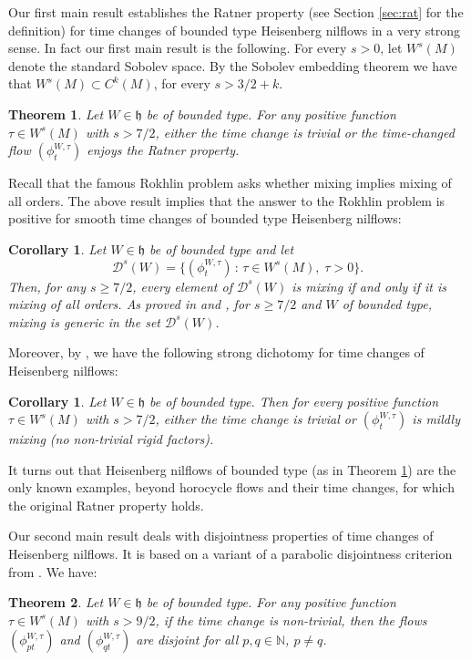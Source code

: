 \documentclass[10pt]{amsart}
\let\mathcal\mathscr
\newcommand{\sep}{\,:\,}
\theoremstyle{definition}
\theoremstyle{plain}
\newtheorem{theorem}{Theorem}
\newtheorem{corollary}[definition]{Corollary}
\newcommand\NN{\mathbb{N}}
\newcommand{\cD}{\mathcal D}
\begin{document}
Our first main result establishes the Ratner property (see Section \ref{sec:rat} for the definition) for time changes of bounded type Heisenberg nilflows in a very strong sense. In fact our first main result is the following.
For every $s>0$, let $W^s(M)$ \hbox{denote} the standard Sobolev space. By the Sobolev embedding theorem we have that $W^s(M) \subset C^k(M)$, for every $s> 3/2 + k$.


\begin{theorem}\label{main:thm'} Let $W\in \mathfrak h$ be of bounded type. For any positive function $\tau\in W^s(M)$ with $s>7/2$, either the time change is trivial or the time-changed flow $(\phi_t^{W,\tau})$ enjoys the Ratner property.
\end{theorem}


Recall that the famous Rokhlin problem asks whether mixing implies mixing of all orders.
The above result implies that the answer to the Rokhlin problem is positive for smooth time changes of bounded type Heisenberg nilflows:
\begin{corollary} Let $W\in \mathfrak h$ be of bounded type and let
\[
\cD^s(W)=\{(\phi_t^{W,\tau})\sep \tau\in W^s(M),\; \tau>0\}.
\]
Then, for any $s\geq 7/2$, every element of $\cD^s(W)$ is mixing if and only if it is mixing of all orders.
As proved in \cite{AFU} and \cite{FK}, for $s\geq 7/2$ and $W$ of bounded type, mixing is generic in the set $\cD^s(W)$.
\end{corollary}

Moreover, by \cite{KL}, we have the following strong dichotomy for time changes of Heisenberg nilflows:
\begin{corollary}\label{corA} Let $W\in \mathfrak h$ be of bounded type. Then for every positive function $\tau\in W^s(M)$ with $s>7/2$, either
the time change is trivial or $(\phi_t^{W,\tau})$ is mildly mixing (no non-trivial rigid factors).
\end{corollary}

It turns out that Heisenberg nilflows of bounded type (as in Theorem \ref{main:thm'}) are the only known examples, beyond horocycle flows and their time changes, for which the original Ratner property holds.

Our second main result deals with disjointness properties of time changes of Heisenberg nilflows. It is based on a variant of a parabolic disjointness criterion from \cite{KLU}. We have:

\begin{theorem}\label{thm:main2'} Let $W\in \mathfrak h$ be of bounded type. For any positive function $\tau\in W^s(M)$ with $s>9/2$, if the time change is non-trivial, then the flows $(\phi_{pt}^{W,\tau})$ and $(\phi_{qt}^{W,\tau})$ are disjoint for
all $p,q\in \NN$, $p\neq q$.
\end{theorem}
\end{document}
